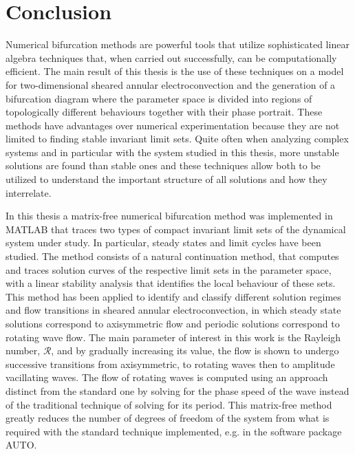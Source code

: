 \chapter{Conclusion}
Numerical bifurcation methods are powerful tools that utilize sophisticated linear algebra techniques that, when carried out successfully, can be computationally efficient.  The main result of this thesis is the use of these techniques on a model for  two-dimensional sheared annular electroconvection and the generation of a bifurcation diagram where the parameter space is divided into regions of topologically different behaviours together with their phase portrait.
These methods have advantages over numerical experimentation because they are not limited to finding stable invariant limit sets. Quite often when analyzing complex systems and in particular with the system studied in this thesis, more unstable solutions are found than stable ones and these techniques allow both to be utilized to understand the important structure of all solutions and how they interrelate.

In this thesis a matrix-free numerical bifurcation method was implemented in MATLAB that traces two types of compact invariant limit sets of the dynamical system under study. In particular, steady states and limit cycles have been studied. The method consists of a natural continuation method, that computes and traces solution curves of the respective limit sets in the parameter space, with a linear stability analysis that identifies the local behaviour of these sets. This method has been applied to identify and classify different solution regimes and flow transitions in sheared annular electroconvection, in which steady state solutions correspond to axisymmetric flow and periodic solutions correspond to rotating wave flow. The main parameter of interest in this work is the Rayleigh number, $\mathcal{R}$, and by gradually increasing its value, the flow is shown to undergo successive transitions from axisymmetric, to rotating waves then to amplitude vacillating waves. The flow of rotating waves is computed using an approach distinct from the standard one by solving for the phase speed of the wave instead of the traditional technique of solving for its period. This {matrix-free} method greatly reduces the number of degrees of freedom of the system from what is required with the standard technique implemented, e.g. in the software package AUTO.

